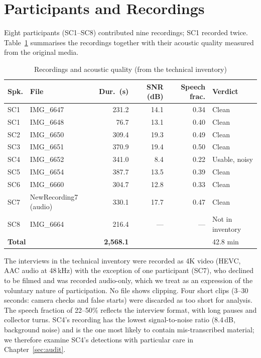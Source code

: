 \documentclass[11pt,a4paper]{report}
\begin{document}
\section{Participants and Recordings}

Eight participants (SC1--SC8) contributed nine recordings; SC1 recorded twice. Table~\ref{tab:rec} summarises the recordings together with their acoustic quality measured from the original media.

\begin{table}[H]
\centering
\caption{Recordings and acoustic quality (from the technical inventory)}
\label{tab:rec}
\footnotesize
\setlength{\tabcolsep}{4pt}
\begin{tabular}{llrrrl}
\toprule
\textbf{Spk.} & \textbf{File} & \textbf{Dur.\ (s)} & \textbf{SNR (dB)} & \textbf{Speech frac.} & \textbf{Verdict} \\
\midrule
SC1 & IMG\_6647 & 231.2 & 14.1 & 0.34 & Clean \\
SC1 & IMG\_6648 &  76.7 & 13.1 & 0.40 & Clean \\
SC2 & IMG\_6650 & 309.4 & 19.3 & 0.49 & Clean \\
SC3 & IMG\_6651 & 370.9 & 19.4 & 0.50 & Clean \\
SC4 & IMG\_6652 & 341.0 &  8.4 & 0.22 & Usable, noisy \\
SC5 & IMG\_6654 & 387.7 & 13.5 & 0.39 & Clean \\
SC6 & IMG\_6660 & 304.7 & 12.8 & 0.33 & Clean \\
SC7 & NewRecording7 (audio) & 330.1 & 17.7 & 0.47 & Clean \\
SC8 & IMG\_6664 & 216.4 & --- & --- & Not in inventory \\
\midrule
\multicolumn{2}{l}{\textbf{Total}} & \textbf{2,568.1} & & & 42.8 min \\
\bottomrule
\end{tabular}
\end{table}

The interviews in the technical inventory were recorded as 4K video (HEVC, AAC audio at 48\,kHz) with the exception of one participant (SC7), who declined to be filmed and was recorded audio-only, which we treat as an expression of the voluntary nature of participation. No file shows clipping. Four short clips (3--30 seconds: camera checks and false starts) were discarded as too short for analysis. The speech fraction of 22--50\% reflects the interview format, with long pauses and collector turns. SC4's recording has the lowest signal-to-noise ratio (8.4\,dB, background noise) and is the one most likely to contain mis-transcribed material; we therefore examine SC4's detections with particular care in Chapter~\ref{sec:audit}.
\end{document}

